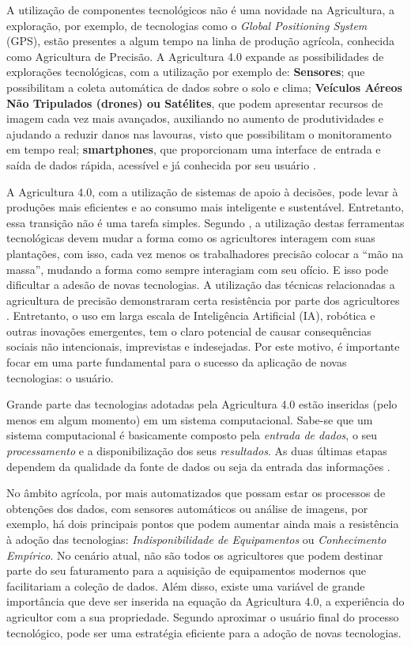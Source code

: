 \documentclass[12pt]{article}
\begin{document}
A utilização de componentes tecnológicos não é uma novidade na Agricultura, a exploração, por exemplo, de tecnologias como o \textit{Global Positioning System} (GPS), estão presentes a algum tempo na linha de produção agrícola, conhecida como Agricultura de Precisão. A Agricultura 4.0 expande as possibilidades de explorações tecnológicas, com a utilização por exemplo de: \textbf{Sensores}; que possibilitam a coleta automática de dados sobre o solo e clima; \textbf{Veículos Aéreos Não Tripulados (drones) ou Satélites}, que podem apresentar recursos de imagem cada vez mais avançados, auxiliando no aumento de produtividades e ajudando a reduzir danos nas lavouras, visto que possibilitam o monitoramento em tempo real; \textbf{smartphones}, que proporcionam uma interface de entrada e saída de dados rápida, acessível e já conhecida por seu usuário \cite{Shepherd:2018}.

A Agricultura 4.0, com a utilização de sistemas de apoio à decisões, pode levar à produções mais eficientes e ao consumo mais inteligente e sustentável. Entretanto, essa transição não é uma tarefa simples. Segundo \cite{Rose:2019}, a utilização destas ferramentas tecnológicas devem mudar a forma como os agricultores interagem com suas plantações, com isso, cada vez menos os trabalhadores precisão colocar a ``mão na massa'', mudando a forma como sempre interagiam com seu ofício. E isso pode dificultar a adesão de novas tecnologias. A utilização das técnicas relacionadas a agricultura de precisão demonstraram certa resistência por parte dos agricultores \cite{Rose:2019}. Entretanto, o uso em larga escala de Inteligência Artificial (IA), robótica e outras inovações emergentes, tem o claro potencial de causar consequências sociais não intencionais, imprevistas e indesejadas. Por este motivo, é importante focar em uma parte fundamental para o sucesso da aplicação de novas tecnologias: o usuário.

Grande parte das tecnologias adotadas pela Agricultura 4.0 estão inseridas (pelo menos em algum momento) em um sistema computacional. Sabe-se que um sistema computacional é basicamente composto pela \textit{entrada de dados}, o seu \textit{processamento} e a disponibilização dos seus \textit{resultados}. As duas últimas etapas dependem da qualidade da fonte de dados ou seja da entrada das informações \cite{Torres:2013}.

No âmbito agrícola, por mais automatizados que possam estar os processos de obtenções dos dados, com sensores automáticos ou análise de imagens, por exemplo, há dois principais pontos que podem aumentar ainda mais a resistência à adoção das tecnologias: \textit{Indisponibilidade de Equipamentos} ou \textit{Conhecimento Empírico}. No cenário atual, não são todos os agricultores que podem destinar parte do seu faturamento para a aquisição de equipamentos modernos que facilitariam a coleção de dados. Além disso, existe uma variável de grande importância que deve ser inserida na equação da Agricultura 4.0, a experiência do agricultor com a sua propriedade. Segundo \cite{Rose:2019} aproximar o usuário final do processo tecnológico, pode ser uma estratégia eficiente para a adoção de novas tecnologias.
\end{document}
